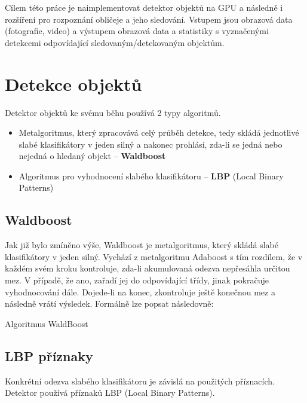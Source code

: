 \documentclass[12pt,a4paper,titlepage,final]{report}
\begin{document}
Cílem této práce je naimplementovat detektor objektů na GPU a následně i rozšíření pro rozpoznání obličeje a jeho sledování. Vstupem jsou obrazová data (fotografie, video) a výstupem obrazová data a statistiky s vyznačenými detekcemi odpovídající sledovaným/detekovaným objektům.

\section{Detekce objektů}

Detektor objektů ke svému běhu používá 2 typy algoritmů. 

\begin{itemize}
	\item Metalgoritmus, který zpracovává celý průběh detekce, tedy skládá jednotlivé slabé klasifikátory v jeden silný a nakonec prohlásí, zda-li se jedná nebo nejedná o hledaný objekt – \textbf{Waldboost}
	\item 	Algoritmus pro vyhodnocení slabého klasifikátoru – \textbf{LBP} (Local Binary Patterns)
	\end{itemize}

\subsection{Waldboost}
Jak již bylo zmíněno výše, Waldboost je metalgoritmus, který skládá slabé klasifikátory v jeden silný. Vychází z metalgoritmu Adaboost s tím rozdílem, že v každém svém kroku kontroluje, zda-li akumulovaná odezva nepřesáhla určitou mez. V případě, že ano, zařadí jej do odpovídající třídy, jinak pokračuje vyhodnocování dále. Dojede-li na konec, zkontroluje ještě konečnou mez a následně vrátí výsledek. Formálně lze popsat následovně:

\begin{algorithm}
\caption{Algoritmus WaldBoost}
\end{algorithm}

\subsection{LBP příznaky}
Konkrétní odezva slabého klasifikátoru je závislá na použitých příznacích. Detektor používá příznaků LBP (Local Binary Patterns).
\end{document}
